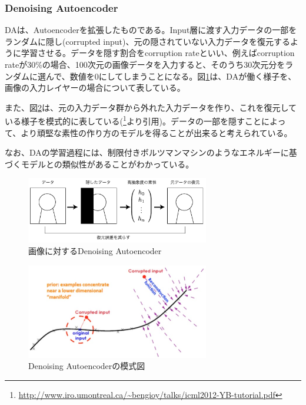 \subsubsection{Denoising Autoencoder}
DAは、Autoencoderを拡張したものである。Input層に渡す入力データの一部をランダムに隠し(corrupted input)、元の隠されていない入力データを復元するように学習させる。データを隠す割合をcorruption rateといい、例えばcorruption rateが30\%の場合、100次元の画像データを入力すると、そのうち30次元分をランダムに選んで、数値を0にしてしまうことになる。図\ref{c3_da_pic}は、DAが働く様子を、画像の入力レイヤーの場合について表している。\par
また、図\ref{c3_da}は、元の入力データ群から外れた入力データを作り、これを復元している様子を模式的に表している(\footnote{\url{http://www.iro.umontreal.ca/~bengioy/talks/icml2012-YB-tutorial.pdf}}より引用)。データの一部を隠すことによって、より頑堅な素性の作り方のモデルを得ることが出来ると考えられている。\par
なお、DAの学習過程には、制限付きボルツマンマシンのようなエネルギーに基づくモデルとの類似性があることがわかっている\cite{vincent2011a-connection}。
\begin{figure}[tbp]
 \begin{center}
  \includegraphics[width=80mm]{img/c3/da_pic}
 \end{center}
 \caption{画像に対するDenoising Autoencoder}
 \label{c3_da_pic}
\end{figure}
\begin{figure}[tbp]
 \begin{center}
  \includegraphics[width=80mm]{img/c3/da}
 \end{center}
 \caption{Denoising Autoencoderの模式図}
 \label{c3_da}
\end{figure}

